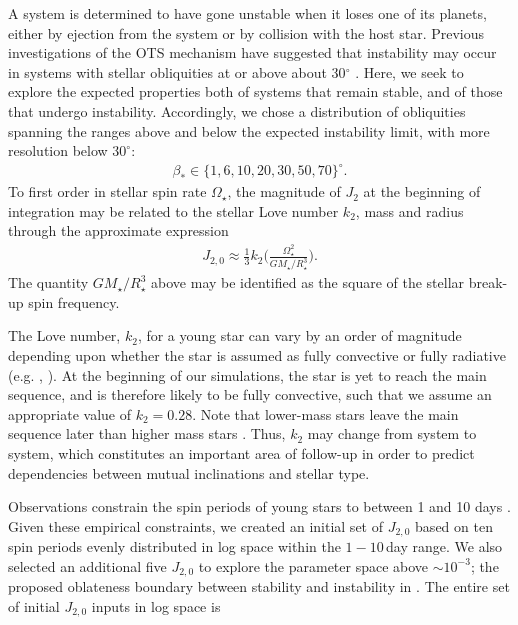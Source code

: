 \documentclass[twocolumn]{aastex63}
\begin{document}
A system is determined to have gone unstable when it loses one of its planets, either by ejection from the system or by collision with the host star. Previous investigations of the OTS mechanism have suggested that instability may occur in systems with stellar obliquities at or above about 30$^{\circ}$ \citep{spalding2016spin, spalding2018resilience}. Here, we seek to explore the expected properties both of systems that remain stable, and of those that undergo instability. Accordingly, we chose a distribution of obliquities spanning the ranges above and below the expected instability limit, with more resolution below $30^\circ$:
\begin{align}
 \beta_*\in\{ 1,6,10,20,30,50,70 \} ^\circ.
\end{align}
To first order in stellar spin rate $\Omega_\star$, the magnitude of $J_2$ at the beginning of integration may be related to the stellar Love number $k_2$, mass and radius through the approximate expression \citep{1939MNRAS..99..451S,Ward1976secular, spalding2016spin}
\begin{align}\label{J2Def}
J_{2,0}\approx\frac{1}{3}k_2\bigg(\frac{\Omega_\star^2}{GM_\star/R_\star^3}\bigg).
\end{align}
 The quantity $GM_\star/R_\star^3$ above may be identified as the square of the stellar break-up spin frequency.
 
 The Love number, \(k_2\), for a young star can vary by an order of magnitude depending upon whether the star is assumed as fully convective or fully radiative (e.g. \citealt{batygin2013magnetic}, \cite{1939MNRAS..99..451S}). At the beginning of our simulations, the star is yet to reach the main sequence, and is therefore likely to be fully convective, such that we assume an appropriate value of \(k_2=0.28\). Note that lower-mass stars leave the main sequence later than higher mass stars \citep{gregory2016influence}. Thus, $k_2$ may change from system to system, which constitutes an important area of follow-up in order to predict dependencies between mutual inclinations and stellar type. 
 
 Observations constrain the spin periods of young stars to between 1 and 10 days \citep{bouvier2014angular}. Given these empirical constraints, we created an initial set of \(J_{2,0}\) based on ten spin periods evenly distributed in log space within the $1-10$\,day range. We also selected an additional five \(J_{2,0}\) to explore the parameter space above $\sim 10^{-3}$; the proposed oblateness boundary between stability and instability in \citet{spalding2018resilience}. The entire set of initial \(J_{2,0}\) inputs in log space is
 
\end{document}
